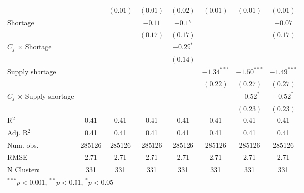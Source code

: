 \begin{tabular}{l c c c c c c c }
                                 &               & $(0.01)$      & $(0.01)$      & $(0.02)$      & $(0.01)$      & $(0.01)$      & $(0.01)$      \\
Shortage                         &               &               & $-0.11$       & $-0.17$       &               &               & $-0.07$       \\
                                 &               &               & $(0.17)$      & $(0.17)$      &               &               & $(0.17)$      \\
$C_{f}$ $\times$ Shortage        &               &               &               & $-0.29^{*}$   &               &               &               \\
                                 &               &               &               & $(0.14)$      &               &               &               \\
Supply shortage                  &               &               &               &               & $-1.34^{***}$ & $-1.50^{***}$ & $-1.49^{***}$ \\
                                 &               &               &               &               & $(0.22)$      & $(0.27)$      & $(0.27)$      \\
$C_{f}$ $\times$ Supply shortage &               &               &               &               &               & $-0.52^{*}$   & $-0.52^{*}$   \\
                                 &               &               &               &               &               & $(0.23)$      & $(0.23)$      \\
\midrule
R$^2$                            & 0.41          & 0.41          & 0.41          & 0.41          & 0.41          & 0.41          & 0.41          \\
Adj. R$^2$                       & 0.41          & 0.41          & 0.41          & 0.41          & 0.41          & 0.41          & 0.41          \\
Num. obs.                        & 285126        & 285126        & 285126        & 285126        & 285126        & 285126        & 285126        \\
RMSE                             & 2.71          & 2.71          & 2.71          & 2.71          & 2.71          & 2.71          & 2.71          \\
N Clusters                       & 331           & 331           & 331           & 331           & 331           & 331           & 331           \\
\bottomrule
\multicolumn{8}{l}{\tiny{$^{***}p<0.001$, $^{**}p<0.01$, $^*p<0.05$}}
\end{tabular}
